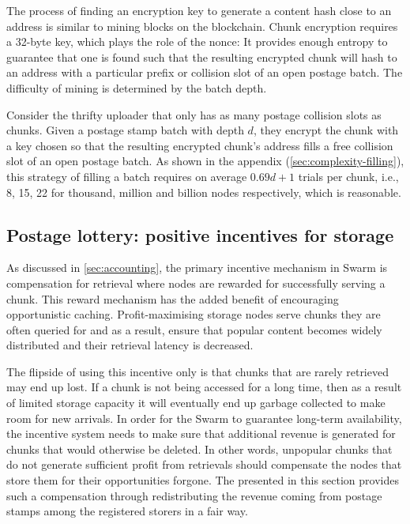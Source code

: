 The process of finding an encryption key to generate a content hash close to an address is similar to mining blocks on the blockchain. Chunk encryption requires a 32-byte key, which plays the role of the nonce: It provides enough entropy to guarantee that one is found such that the resulting encrypted chunk will hash to an address with a particular prefix or collision slot of an open postage batch. The difficulty of mining is determined by the batch depth. 

Consider the thrifty uploader that only has as many postage collision slots as chunks. Given a postage stamp batch with depth $d$, they encrypt the chunk with a key chosen so that the resulting encrypted chunk's address fills a free collision slot of an open postage batch. As shown in the  appendix  (\ref{sec:complexity-filling}), this strategy of filling a batch requires on average $0.69d+1$ trials per chunk, i.e., 8, 15, 22 for thousand, million  and billion nodes respectively, which is reasonable.


\subsection{Postage lottery: positive incentives for storage}\label{sec:postage-lottery}

\yellow{}

As discussed in \ref{sec:accounting}, the primary incentive mechanism in Swarm is compensation for retrieval where nodes are rewarded for successfully serving a chunk. This reward mechanism has the added benefit of encouraging opportunistic caching. Profit-maximising storage nodes serve chunks they are often queried for and as a result, ensure that popular content becomes widely distributed and their retrieval latency is decreased.

The flipside of using this incentive only is that chunks that are rarely retrieved may end up lost. If a chunk is not being accessed for a long time, then as a result of limited storage capacity it will eventually end up garbage collected to make room for new arrivals. In order for the Swarm to guarantee long-term availability, the incentive system needs to make sure that additional revenue is generated for chunks that would otherwise be deleted. In other words, unpopular chunks that do not generate sufficient profit from retrievals should compensate the nodes that store them for their opportunities forgone. The  presented in this section provides such a compensation through redistributing the revenue coming from postage stamps among the registered storers in a fair way.



